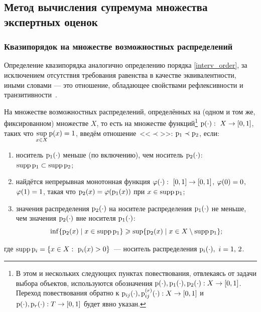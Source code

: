 \subsection{Метод вычисления супремума множества экспертных оценок}
\label{easy_collective_sup}

\subsubsection{Квазипорядок на множестве возможностных распределений}
\label{preorder_pyt}

Определение квазипорядка аналогично определению порядка \eqref{interv_order}, за исключением отсутствия требования равенства в качестве эквивалентности, иными словами --- это отношение, обладающее свойствами рефлексивности и транзитивности~\cite{Mirkin}.

На множестве возможностных распределений, определённых на (одном и том же, фиксированном) множестве $X$, то есть на множестве функций\footnote{В этом и нескольких следующих пунктах повествования, отвлекаясь от задачи выбора объектов, используются обозначения ${\mathrm{p}}(\cdot), {\mathrm{p}}_1(\cdot), {\mathrm{p}}_2(\cdot): X\to [0,1]$. Переход повествования обратно к ${\mathrm{p}}_{ij}(\cdot),{\mathrm{p}}_{ij}^{(r)}(\cdot): X\to [0,1] $ и ${\mathrm{p}}(\cdot),{\mathrm{p}}_{r}(\cdot): T\to [0,1] $ будет явно указан.} ${\mathrm{p}}(\cdot):\ X\to[0,1]$, таких что $\displaystyle \sup_{x\in X} {\mathrm{p}}(x) = 1$, введём отношение~<<$\prec$>>: ${\mathrm{p}}_1\prec{\mathrm{p}}_2$, если:
\begin{enumerate}
    \item\label{order-D1}
        носитель ${\mathrm{p}}_1(\cdot)$ меньше (по включению), чем носитель ${\mathrm{p}}_2(\cdot)$: ${\mathrm{supp}}\,{\mathrm{p}}_1\subset{\mathrm{supp}}\,{\mathrm{p}}_2$;
    \item\label{order-D2}
        найдётся непрерывная монотонная функция ${\mygamma(\cdot):\ [0,1]\to[0,1]}$, $\varphi(0) = 0$, $\varphi(1) = 1$, такая что ${\mathrm{p}}_2(x) = \varphi({\mathrm{p}}_1(x))$ при $x\in{\mathrm{supp}}\,{\mathrm{p}}_1$;
    \item\label{order-D3}
        значения распределения ${\mathrm{p}}_2(\cdot)$ на носителе распределения ${\mathrm{p}}_1(\cdot)$ не меньше, чем значения ${\mathrm{p}}_2(\cdot)$ вне носителя ${\mathrm{p}}_1(\cdot)$:
        $$\inf\{{\mathrm{p}}_2(x) \mid x\in{\mathrm{supp}}\,{\mathrm{p}}_1\} \geqslant \sup\{{\mathrm{p}}_2(x) \mid x\in X\setminus{\mathrm{supp}}\,{\mathrm{p}}_1\};$$
\end{enumerate}
где ${\mathrm{supp}}\, {\mathrm{p}}_i = \{x\in X:\ {\mathrm{p}}_i(x) > 0\}$~--- носитель распределения ${\mathrm{p}}_i(\cdot),\ i=1,\, 2$.

